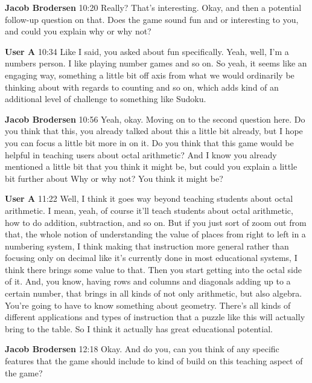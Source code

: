 \documentclass{article}
\begin{document}
\noindent \textbf{Jacob Brodersen}   10:20
Really? That's interesting.
Okay, and then a potential follow-up question on that. Does the game sound fun and or interesting to you, and could you explain why or why not?

\noindent \textbf{User A}   10:34
Like I said, you asked about fun specifically. Yeah, well, I'm a numbers person. I like playing number games and so on. So yeah, it seems like an engaging way, something a little bit off axis from what we would ordinarily be thinking about with regards to counting and so on, which adds kind of an additional level of challenge to
something like Sudoku.

\noindent \textbf{Jacob Brodersen}   10:56
Yeah, okay.
Moving on to the second question here. Do you think that this, you already talked about this a little bit already, but I hope you can focus a little bit more in on it. Do you think that this game would be helpful in teaching users about octal arithmetic? And I know you already mentioned a little bit that you think it might be, but could you explain a little bit further about
Why or why not? You think it might be?

\noindent \textbf{User A}   11:22
Well, I think it goes way beyond teaching students about octal arithmetic. I mean, yeah, of course it'll teach students about octal arithmetic, how to do addition, subtraction, and so on. But if you just sort of zoom out from that, the whole notion of understanding the value of places from right to left in a numbering system,
I think making that instruction more general rather than focusing only on decimal like it's currently done in most educational systems, I think there brings some value to that. Then you start getting into the octal side of it. And, you know, having rows and columns and diagonals adding up to a certain number, that brings in all kinds of not only arithmetic, but also algebra.
You're going to have to know something about geometry. There's all kinds of different applications and types of instruction that a puzzle like this will actually bring to the table. So I think it actually has great educational potential.

\noindent \textbf{Jacob Brodersen}   12:18
Okay. And do you, can you think of any specific features that the game should include to kind of build on this teaching aspect of the game?
\end{document}
